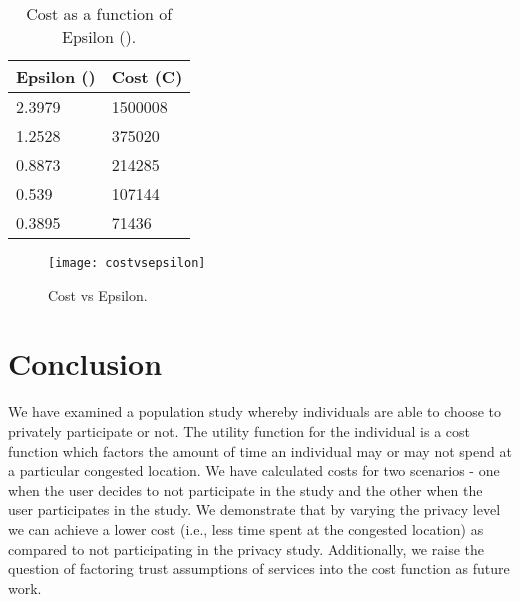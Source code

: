 \documentclass[conference]{IEEEtran}
\begin{document}
\begin{table}[]
\small
\centering
\begin{tabular}{l|l}
\textbf{Epsilon ()} & \textbf{Cost (C)} \\
\hline
2.3979               & 1500008           \\ \hline
1.2528               & 375020            \\ \hline
0.8873               & 214285            \\ \hline
0.539                & 107144            \\ \hline
0.3895               & 71436            
\end{tabular}
\caption{Cost as a function of Epsilon ().}
\label{tab:costepsilon}
\end{table}



\begin{figure}[t!]
\centering
\texttt{[image: costvsepsilon]}
\caption{Cost vs Epsilon.}
\label{fig:costvsepsilon}
\end{figure}
 \section{Conclusion}

We have examined a population study whereby individuals are able to choose to privately participate or not. The utility function for the individual is a cost function which factors the amount of time an individual may or may not spend at a particular congested location. We have calculated costs for two scenarios - one when the user decides to not participate in the study and the other when the user participates in the study. We demonstrate that by varying the privacy level  we can achieve a lower cost (i.e., less time spent at the congested location) as compared to not participating in the privacy study. Additionally, we raise the question of factoring trust assumptions of services into the cost function as future work.
 


\end{document}
